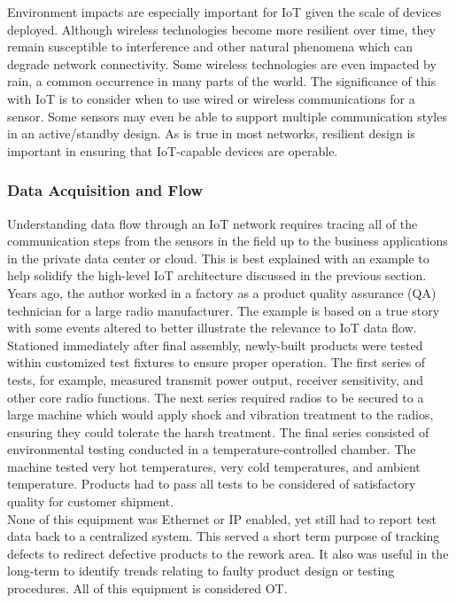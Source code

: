 Environment impacts are especially important for IoT given the scale of
devices deployed. Although wireless technologies become more resilient over
time, they remain susceptible to interference and other natural phenomena
which can degrade network connectivity. Some wireless technologies are even
impacted by rain, a common occurrence in many parts of the world. The
significance of this with IoT is to consider when to use wired or wireless
communications for a sensor. Some sensors may even be able to support multiple
communication styles in an active/standby design. As is true in most networks,
resilient design is important in ensuring that IoT-capable devices are operable. \\

\subsubsection{Data Acquisition and Flow}
Understanding data flow through an IoT network requires tracing all of the
communication steps from the sensors in the field up to the business
applications in the private data center or cloud. This is best explained with
an example to help solidify the high-level IoT architecture discussed in the
previous section. \\

Years ago, the author worked in a factory as a product quality assurance (QA)
technician for a large radio manufacturer. The example is based on a true
story with some events altered to better illustrate the relevance to IoT data
flow. \\

Stationed immediately after final assembly, newly-built products were tested
within customized test fixtures to ensure proper operation. The first series
of tests, for example, measured transmit power output, receiver sensitivity,
and other core radio functions. The next series required radios to be secured
to a large machine which would apply shock and vibration treatment to the
radios, ensuring they could tolerate the harsh treatment. The final series
consisted of environmental testing conducted in a temperature-controlled
chamber. The machine tested very hot temperatures, very cold temperatures, and
ambient temperature. Products had to pass all tests to be considered of
satisfactory quality for customer shipment. \\

None of this equipment was Ethernet or IP enabled, yet still had to report
test data back to a centralized system. This served a short term purpose of
tracking defects to redirect defective products to the rework area. It also
was useful in the long-term to identify trends relating to faulty product
design or testing procedures. All of this equipment is considered OT\@. \\

